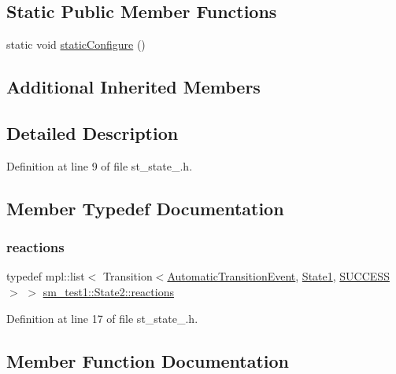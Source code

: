 \subsection*{Static Public Member Functions}
\begin{DoxyCompactItemize}
\item 
static void \hyperlink{structsm__test1_1_1State2_a533c34b9588cdc47090affe78971773b}{static\+Configure} ()
\end{DoxyCompactItemize}
\subsection*{Additional Inherited Members}


\subsection{Detailed Description}


Definition at line 9 of file st\+\_\+state\+\_.\+h.



\subsection{Member Typedef Documentation}
\mbox{\label{structsm__test1_1_1State2_a8cef0870f3bb2b87bab9ad9450a59b8c}} 
\subsubsection{\texorpdfstring{reactions}{reactions}}
{\footnotesize\ttfamily typedef mpl\+::list$<$ Transition$<$\hyperlink{structsm__test1_1_1AutomaticTransitionEvent}{Automatic\+Transition\+Event}, \hyperlink{structsm__test1_1_1State1}{State1}, \hyperlink{classSUCCESS}{S\+U\+C\+C\+E\+SS}$>$ $>$ \hyperlink{structsm__test1_1_1State2_a8cef0870f3bb2b87bab9ad9450a59b8c}{sm\+\_\+test1\+::\+State2\+::reactions}}



Definition at line 17 of file st\+\_\+state\+\_.\+h.



\subsection{Member Function Documentation}
\mbox{\label{structsm__test1_1_1State2_a2bbc60d8afa17da9513f811e87f17622}} 
